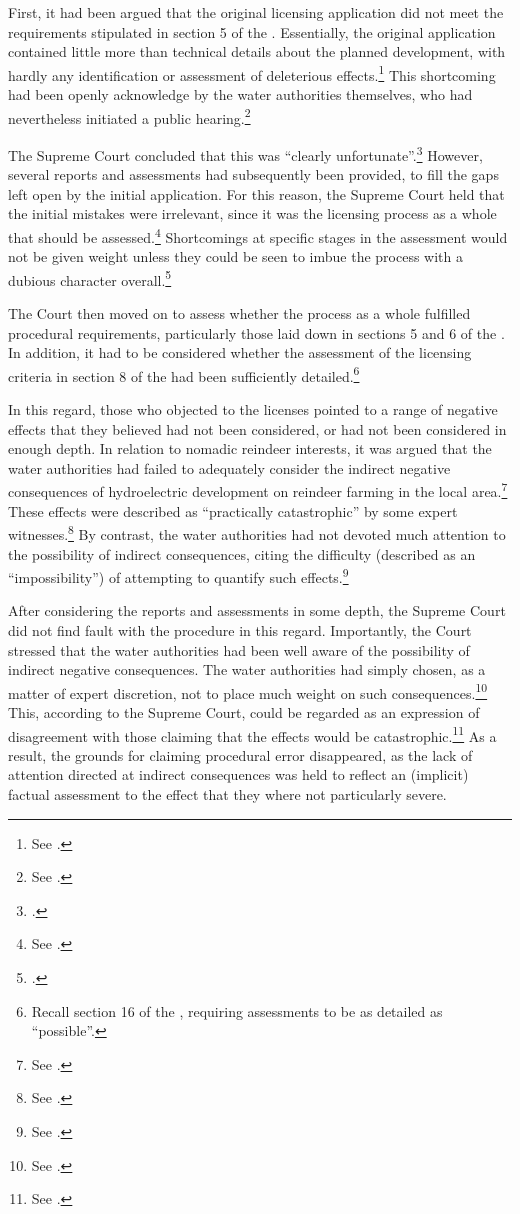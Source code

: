 First, it had been argued that the original licensing application did not meet the requirements stipulated in section 5 of the \cite{wra17}. Essentially, the original application contained little more than technical details about the planned development, with hardly any identification or assessment of deleterious effects.\footnote{See \cite[264-265]{alta82}.} This shortcoming had been openly acknowledge by the water authorities themselves, who had nevertheless initiated a public hearing.\footnote{See \cite[265]{alta82}.}

The Supreme Court concluded that this was ``clearly unfortunate''.\footcite[265]{alta82} However, several reports and assessments had subsequently been provided, to fill the gaps left open by the initial application. For this reason, the Supreme Court held that the initial mistakes were irrelevant, since it was the licensing process as a whole that should be assessed.\footnote{See \cite[265-266]{alta82}.} Shortcomings at specific stages in the assessment would not be given weight unless they could be seen to imbue the process with a dubious character overall.\footcite[265]{alta82}

The Court then moved on to assess whether the process as a whole fulfilled procedural requirements, particularly those laid down in sections 5 and 6 of the \cite{wra17}. In addition, it had to be considered whether the assessment of the licensing criteria in section 8 of the \cite{wra17} had been sufficiently detailed.\footnote{Recall section 16 of the \cite{paa67}, requiring assessments to be as detailed as ``possible''.}

In this regard, those who objected to the licenses pointed to a range of negative effects that they believed had not been considered, or had not been considered in enough depth. In relation to nomadic reindeer interests, it was argued that the water authorities had failed to adequately consider the indirect negative consequences of hydroelectric development on reindeer farming in the local area.\footnote{See \cite[176-179]{alta82}.} These effects were described as ``practically catastrophic'' by some expert witnesses.\footnote{See \cite[278]{alta82}.} By contrast, the water authorities had not devoted much attention to the possibility of indirect consequences, citing the difficulty (described as an ``impossibility'') of attempting to quantify such effects.\footnote{See \cite[277]{alta82}.}

After considering the reports and assessments in some depth, the Supreme Court did not find fault with the procedure in this regard. Importantly, the Court stressed that the water authorities had been well aware of the possibility of indirect negative consequences. The water authorities had simply chosen, as a matter of expert discretion, not to place much weight on such consequences.\footnote{See \cite[279]{alta82}.} This, according to the Supreme Court, could be regarded as an expression of disagreement with those claiming that the effects would be catastrophic.\footnote{See \cite[278]{alta82}.} As a result, the grounds for claiming procedural error disappeared, as the lack of attention directed at indirect consequences was held to reflect an (implicit) factual assessment to the effect that they where not particularly severe.

